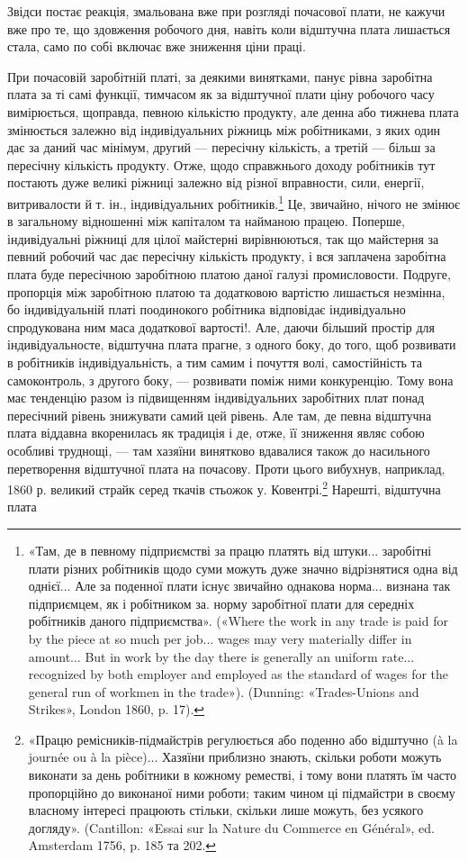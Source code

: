 Звідси постає реакція, змальована вже при розгляді почасової
плати, не кажучи вже про те, що здовження робочого дня, навіть
коли відштучна плата лишається стала, само по собі включає
вже зниження ціни праці.

При почасовій заробітній платі, за деякими винятками, панує
рівна заробітна плата за ті самі функції, тимчасом як за відштучної
плати ціну робочого часу вимірюється, щоправда, певною
кількістю продукту, але денна або тижнева плата змінюється
залежно від індивідуальних ріжниць між робітниками, з яких
один дає за даний час мінімум, другий — пересічну кількість,
а третій — більш за пересічну кількість продукту. Отже, щодо
справжнього доходу робітників тут постають дуже великі ріжниці
залежно від різної вправности, сили, енергії, витривалости
й т. ін., індивідуальних робітників.\footnote{
«Там, де в певному підприємстві за працю платять від штуки...
заробітні плати різних робітників щодо суми можуть дуже значно відрізнятися
одна від однієї... Але за поденної плати існує звичайно однакова
норма... визнана так підприємцем, як і робітником за. норму заробітної
плати для середніх робітників даного підприємства». («Where the
work in any trade is paid for by the piece at so much per job... wages may
very materially differ in amount... But in work by the day there is generally
an uniform rate... recognized by both employer and employed as the
standard of wages for the general run of workmen in the trade»). (Dunning:
«Trades-Unions and Strikes», London 1860, p. 17).
} Це, звичайно, нічого не
змінює в загальному відношенні між капіталом та найманою
працею. Поперше, індивідуальні ріжниці для цілої майстерні
вирівнюються, так що майстерня за певний робочий час дає пересічну
кількість продукту, і вся заплачена заробітна плата буде
пересічною заробітною платою даної галузі промисловости. Подруге,
пропорція між заробітною платою та додатковою вартістю
лишається незмінна, бо індивідуальній платі поодинокого робітника
відповідає індивідуально спродукована ним маса додаткової
вартості!. Але, даючи більший простір для індивідуальносте,
відштучна плата прагне, з одного боку, до того, щоб розвивати в
робітників індивідуальність, а тим самим і почуття волі, самостійність
та самоконтроль, з другого боку, — розвивати поміж
ними конкуренцію. Тому вона має тенденцію разом із підвищенням
індивідуальних заробітних плат понад пересічний рівень
знижувати самий цей рівень. Але там, де певна відштучна
плата віддавна вкоренилась як традиція і де, отже, її зниження
являє собою особливі труднощі, — там хазяїни винятково вдавалися
також до насильного перетворення відштучної плата на почасову.
Проти цього вибухнув, наприклад, 1860 р. великий страйк
серед ткачів стьожок у. Ковентрі.\footnote{
«Працю ремісників-підмайстрів регулюється або поденно або
відштучно (à la journée ou à la pièce)... Хазяїни приблизно знають,
скільки роботи можуть виконати за день робітники в кожному реместві,
і тому вони платять їм часто пропорційно до виконаної ними роботи;
таким чином ці підмайстри в своєму власному інтересі працюють стільки,
скільки лише можуть, без усякого догляду». (Cantillon: «Essai sur la
Nature du Commerce en Général», ed. Amsterdam 1756, p. 185 та 202.
} Нарешті, відштучна плата